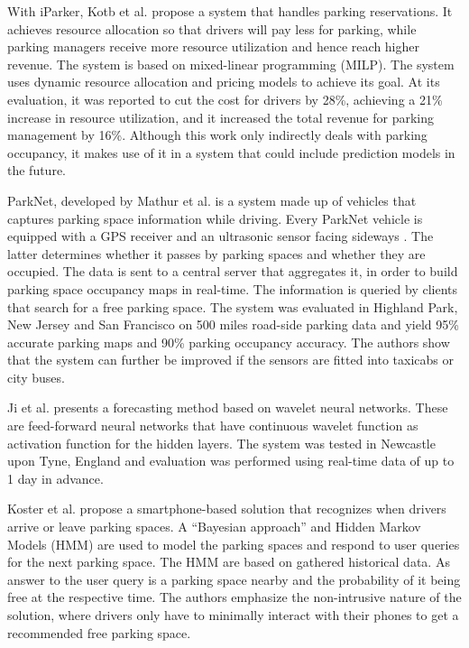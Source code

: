 With iParker, Kotb et al. \cite{kotb} propose a system that handles parking reservations. It achieves resource allocation so that drivers will pay less for parking, while parking managers receive more resource utilization and hence reach higher revenue. The system is based on mixed-linear programming (MILP). The system uses dynamic resource allocation and pricing models to achieve its goal. At its evaluation, it was reported to cut the cost for drivers by 28\%, achieving a 21\% increase in resource utilization, and it increased the total revenue for parking management by 16\%. Although this work only indirectly deals with parking occupancy, it makes use of it in a system that could include prediction models in the future.


ParkNet, developed by Mathur et al. \cite{mathur} is a system made up of vehicles that captures parking space information while driving. Every ParkNet vehicle is equipped with a GPS receiver and an ultrasonic sensor facing sideways
. The latter determines whether it passes by parking spaces and whether they are occupied. The data is sent to a central server that aggregates it, in order to build parking space occupancy maps in real-time. The information is queried by clients that search for a free parking space. The system was evaluated in Highland Park, New Jersey and San Francisco on 500 miles road-side parking data and yield 95\% accurate parking maps and 90\% parking occupancy accuracy. The authors show that the system can further be improved if the sensors are fitted into taxicabs or city buses.

Ji et al. \cite{ji} presents a forecasting method based on wavelet neural networks. These are feed-forward neural networks that have continuous wavelet function as activation function for the hidden layers. The system was tested in Newcastle upon Tyne, England and evaluation was performed using real-time data of up to 1 day in advance.

Koster et al. \cite{koster} propose a smartphone-based solution that recognizes when drivers arrive or leave parking spaces. A ``Bayesian approach'' and Hidden Markov Models (HMM) are used to model the parking spaces and respond to user queries for the next parking space. The HMM are based on gathered historical data. As answer to the user query is a parking space nearby and the probability of it being free at the respective time. The authors emphasize the non-intrusive nature of the solution, where drivers only have to minimally interact with their phones to get a recommended free parking space.


